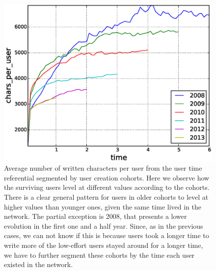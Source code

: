 \begin{figure}[!tb]
\centering
\includegraphics[scale=0.4]{./images/avr_comment_size_user_cohorts.eps}
\caption{Average number of written characters per user from the user time referential segmented by user creation cohorts. Here we observe how the surviving users level at different values according to the cohorts. There is a clear general pattern for users in older cohorts to level at higher values than younger ones, given the same time lived in the network. The partial exception is 2008, that presents a lower evolution in the first one and a half year. Since, as in the previous cases, we can not know if this is because users took a longer time to write more of the low-effort users stayed around for a longer time, we have to further segment these cohorts by the time each user existed in the network.}
\label{fig:avr_comment_size_user_cohorts}
\end{figure}


